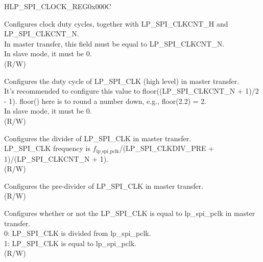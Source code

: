 \begin{register}{H}{LP\_SPI\_CLOCK\_REG}{0x000C}\label{regdesc:LPSPICLOCKREG}
%
%
%
%
%
%
\regnewline%
\begin{regdesc}\begin{reglist}
\label{fielddesc:LPSPICLKCNTL}\item [LP\_SPI\_CLKCNT\_L] Configures clock duty cycles, together with LP\_SPI\_CLKCNT\_H and LP\_SPI\_CLKCNT\_N.\\
In master transfer, this field must be equal to LP\_SPI\_CLKCNT\_N. \\
In slave mode, it must be 0. \\
(R/W)
\label{fielddesc:LPSPICLKCNTH}\item [LP\_SPI\_CLKCNT\_H] Configures the duty cycle of LP\_SPI\_CLK (high level) in master transfer.\\
It's recommended to configure this value to floor((LP\_SPI\_CLKCNT\_N + 1)/2 - 1). floor() here is to round a number down, e.g., floor(2.2) = 2. \\
In slave mode, it must be 0. \\
 (R/W)
\label{fielddesc:LPSPICLKCNTN}\item [LP\_SPI\_CLKCNT\_N] Configures the divider of LP\_SPI\_CLK in master transfer.\\
LP\_SPI\_CLK frequency is $f_{\textrm{lp\_spi\_pclk}}$/(LP\_SPI\_CLKDIV\_PRE + 1)/(LP\_SPI\_CLKCNT\_N + 1). \\
 (R/W)
\label{fielddesc:LPSPICLKDIVPRE}\item [LP\_SPI\_CLKDIV\_PRE] Configures the pre-divider of LP\_SPI\_CLK in master transfer.\\
 (R/W)
\label{fielddesc:LPSPICLKEQUSYSCLK}\item [LP\_SPI\_CLK\_EQU\_SYSCLK] Configures whether or not the LP\_SPI\_CLK is equal to lp\_spi\_pclk in master transfer.\\
0: LP\_SPI\_CLK is divided from lp\_spi\_pclk.\\
1: LP\_SPI\_CLK is equal to lp\_spi\_pclk.\\
 (R/W)
\end{reglist}\end{regdesc}
\end{register}



